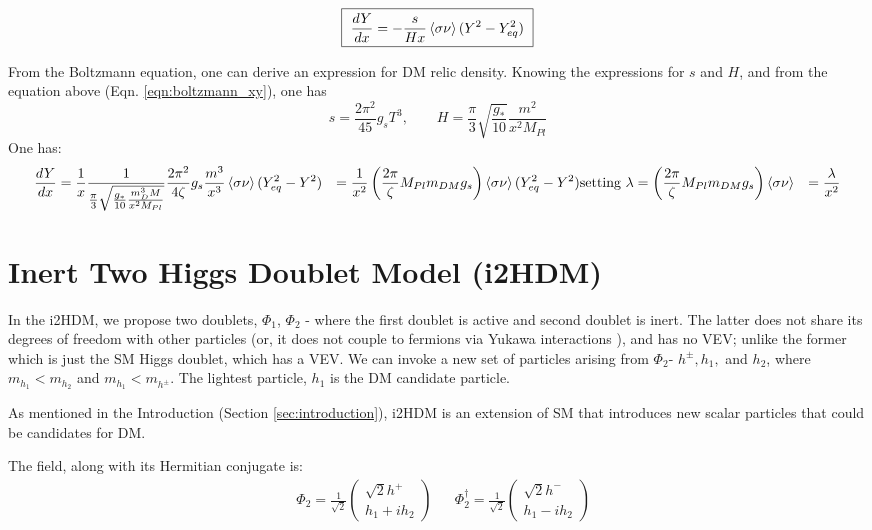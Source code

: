 \documentclass[12pt]{article}
\begin{document}
\begin{equation}
    \boxed{\text{ }\frac{dY}{dx} = -\frac{s}{Hx}\braket{\sigma\nu}(Y^2 - Y^2_{eq})\text{ }}
    \label{eqn:boltzmann_xy}
\end{equation}

From the Boltzmann equation, one can derive an expression for DM relic density. Knowing the expressions for $s$ and $H$, and from the equation above (Eqn. \ref{eqn:boltzmann_xy}), one has
\begin{equation}
    s = \frac{2 \pi^2}{45}{g_s}T^3, \qquad 
    H = \frac{\pi}{3}\sqrt{\frac{g_*}{10}}\frac{m^2}{x^2 M_{Pl}}
\end{equation}
One has:
\begin{equation}
    \begin{align}
        \frac{dY}{dx} &= \frac{1}{x}\frac{1}{\frac{\pi}{3}\sqrt{\frac{g_*}{10}\frac{m^3_DM}{x^2 M_{Pl}}}}\frac{2 \pi^2}{4\zeta}g_s \frac{m^3}{x^3}\braket{\sigma \nu}(Y_{eq}^2 - Y^2)
        &= \frac{1}{x^2}\left(\frac{2 \pi}{\zeta}M_{Pl}m_{DM}g_s\right)\braket{\sigma \nu}(Y_{eq}^2 - Y^2)
        &\text{setting }\lambda = \left(\frac{2 \pi}{\zeta}M_{Pl}m_{DM}g_s\right)\braket{\sigma \nu}
        &= \frac{\lambda}{x^2} 
    \end{align}

\end{equation}
\section{Inert Two Higgs Doublet Model (i2HDM)}
\label{sec:i2HDM}
In the i2HDM, we propose two doublets, $\Phi_1$, $\Phi_2$ - where the first doublet is active and second doublet is inert. The latter does not share its degrees of freedom with other particles (or, it does not couple to fermions via Yukawa interactions \cite{Belyaev_2022}), and has no VEV; unlike the former which is just the SM Higgs doublet, which has a VEV. We can invoke a new set of particles arising from $\Phi_2$- $h^\pm, h_1,$ and $h_2$, where $m_{h_1} < m_{h_2}$ and $m_{h_1} < m_{h^\pm}$. The lightest particle, $h_1$ is the DM candidate particle.

As mentioned in the Introduction (Section \ref{sec:introduction}), i2HDM is an extension of SM that introduces new scalar particles that could be candidates for DM.

The field, along with its Hermitian conjugate is:
\begin{align}
    &\Phi_2 = \frac{1}{\sqrt{2}}
        \begin{pmatrix}
            {\sqrt{2}h^+} \\
            {h_1 + ih_2 }
        \end{pmatrix}&
    &\Phi_2^\dagger = \frac{1}{\sqrt{2}} 
        \begin{pmatrix}
            {\sqrt{2}h^-} \\
            {h_1 - ih_2 }
        \end{pmatrix}
\end{align} 
\end{document}
